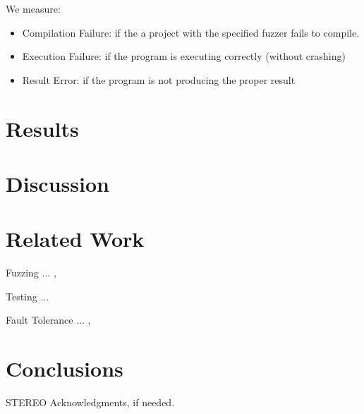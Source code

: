\documentclass[10pt]{sigplanconf}
\begin{document}
We measure:

\begin{itemize}
	\item Compilation Failure: if the a project with the specified fuzzer fails to compile.
	\item Execution Failure: if the program is executing correctly (without crashing)
	\item Result Error: if the program is not producing the proper result
\end{itemize}

\section{Results} %

\section{Discussion} %

\section{Related Work} %

Fuzzing ... \cite{TJC08}, \cite{WWGZ11}

Testing ... \cite{HAM06}

Fault Tolerance ... \cite{KOKR07}, \cite{LYU95}

\section{Conclusions} %

\acks

STEREO
Acknowledgments, if needed.








\end{document}
